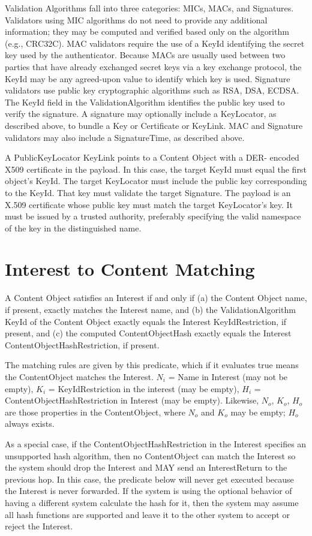 \documentclass[12pt]{article}
\begin{document}
Validation Algorithms fall into three categories: MICs, MACs, and
Signatures.  Validators using MIC algorithms do not need to provide
any additional information; they may be computed and verified based
only on the algorithm (e.g., CRC32C).  MAC validators require the use
of a KeyId identifying the secret key used by the authenticator.
Because MACs are usually used between two parties that have already
exchanged secret keys via a key exchange protocol, the KeyId may be
any agreed-upon value to identify which key is used.  Signature
validators use public key cryptographic algorithms such as RSA, DSA,
ECDSA.  The KeyId field in the ValidationAlgorithm identifies the
public key used to verify the signature.  A signature may optionally
include a KeyLocator, as described above, to bundle a Key or
Certificate or KeyLink.  MAC and Signature validators may also
include a SignatureTime, as described above.

A PublicKeyLocator KeyLink points to a Content Object with a DER-
encoded X509 certificate in the payload.  In this case, the target
KeyId must equal the first object's KeyId.  The target KeyLocator
must include the public key corresponding to the KeyId.  That key
must validate the target Signature.  The payload is an X.509
certificate whose public key must match the target KeyLocator's key.
It must be issued by a trusted authority, preferably specifying the
valid namespace of the key in the distinguished name.

\section{Interest to Content Matching} \label{sec:matching}
A Content Object satisfies an Interest if and only if (a) the Content
Object name, if present, exactly matches the Interest name, and (b)
the ValidationAlgorithm KeyId of the Content Object exactly equals
the Interest KeyIdRestriction, if present, and (c) the computed
ContentObjectHash exactly equals the Interest
ContentObjectHashRestriction, if present.

The matching rules are given by this predicate, which if it evaluates
true means the ContentObject matches the Interest.  $N_i$ = Name in
Interest (may not be empty), $K_i$ = KeyIdRestriction in the interest
(may be empty), $H_i$ = ContentObjectHashRestriction in Interest (may be
empty).  Likewise, $N_o$, $K_o$, $H_o$ are those properties in the
ContentObject, where $N_o$ and $K_o$ may be empty; $H_o$ always exists.

As a special case, if the ContentObjectHashRestriction in the
Interest specifies an unsupported hash algorithm, then no
ContentObject can match the Interest so the system should drop the
Interest and MAY send an InterestReturn to the previous hop.  In this
case, the predicate below will never get executed because the
Interest is never forwarded.  If the system is using the optional
behavior of having a different system calculate the hash for it, then
the system may assume all hash functions are supported and leave it
to the other system to accept or reject the Interest.
\end{document}

